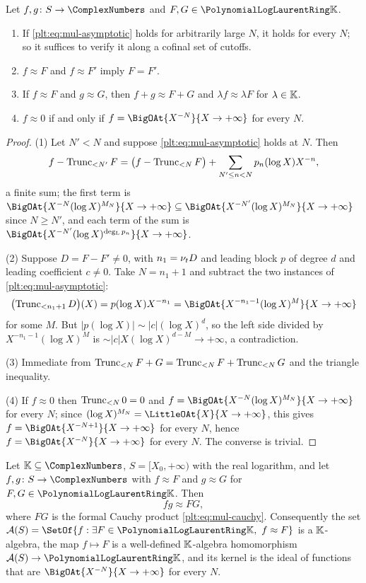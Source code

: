 \begin{lemma}
\label{plt:lem:mul-asymptotic-basic}
Let $f,g\colon S\to\ComplexNumbers$ and $F,G\in\PLlau$.
\begin{enumerate}
\item If \eqref{plt:eq:mul-asymptotic} holds for arbitrarily large $N$, it
holds for every $N$; so it suffices to verify it along a cofinal set of
cutoffs.
\item $f\approx F$ and $f\approx F'$ imply $F=F'$.
\item If $f\approx F$ and $g\approx G$, then $f+g\approx F+G$ and
$\lambda f\approx\lambda F$ for $\lambda\in\K$.
\item $f\approx0$ if and only if $f=\BigOAt{X^{-N}}{X\to+\infty}$ for every
$N$.
\end{enumerate}
\end{lemma}

\begin{proof}
(1) Let $N'<N$ and suppose \eqref{plt:eq:mul-asymptotic} holds at $N$.  Then
\[
 f-\Trunc{F}{N'}=\bigl(f-\Trunc{F}{N}\bigr)
   +\sum_{N'\le n<N}p_n(\log X)X^{-n},
\]
a finite sum; the first term is $\BigOAt{X^{-N}(\log
X)^{M_N}}{X\to+\infty}\subseteq\BigOAt{X^{-N'}(\log X)^{M_N}}{X\to+\infty}$
since $N\ge N'$, and each term of the sum is
$\BigOAt{X^{-N'}(\log X)^{\degL p_n}}{X\to+\infty}$.

(2) Suppose $D=F-F'\ne0$, with $n_1=\ordt D$ and leading block $p$ of degree
$d$ and leading coefficient $c\ne0$.  Take $N=n_1+1$ and subtract the two
instances of \eqref{plt:eq:mul-asymptotic}:
\[
 \bigl(\Trunc{D}{n_1+1}\bigr)(X)=p(\log X)X^{-n_1}
 =\BigOAt{X^{-n_1-1}(\log X)^{M}}{X\to+\infty}
\]
for some $M$.  But $|p(\log X)|\sim|c|(\log X)^{d}$, so the left side
divided by $X^{-n_1-1}(\log X)^M$ is $\sim|c|X(\log X)^{d-M}\to+\infty$, a
contradiction.

(3) Immediate from
$\Trunc{F+G}{N}=\Trunc{F}{N}+\Trunc{G}{N}$ and the triangle inequality.

(4) If $f\approx0$ then $\Trunc{0}{N}=0$ and $f=\BigOAt{X^{-N}(\log
X)^{M_N}}{X\to+\infty}$ for every $N$; since $(\log
X)^{M_N}=\LittleOAt{X}{X\to+\infty}$, this gives
$f=\BigOAt{X^{-N+1}}{X\to+\infty}$ for every $N$, hence
$f=\BigOAt{X^{-N}}{X\to+\infty}$ for every $N$.  The converse is trivial.
\end{proof}

\begin{theorem}
\label{plt:thm:mul-analytic-product}
Let $\K\subseteq\ComplexNumbers$, $S=[X_0,+\infty)$ with the real logarithm,
and let $f,g\colon S\to\ComplexNumbers$ with $f\approx F$ and $g\approx G$
for $F,G\in\PLlau$.  Then
\[
 fg\approx FG,
\]
where $FG$ is the formal Cauchy product \eqref{plt:eq:mul-cauchy}.
Consequently the set
$\mathcal A(S)=\SetOf{f:\exists F\in\PLlau,\ f\approx F}$ is a
$\K$-algebra, the map $f\mapsto F$ is a well-defined $\K$-algebra
homomorphism $\mathcal A(S)\to\PLlau$, and its kernel is the ideal of
functions that are $\BigOAt{X^{-N}}{X\to+\infty}$ for every $N$.
\end{theorem}

